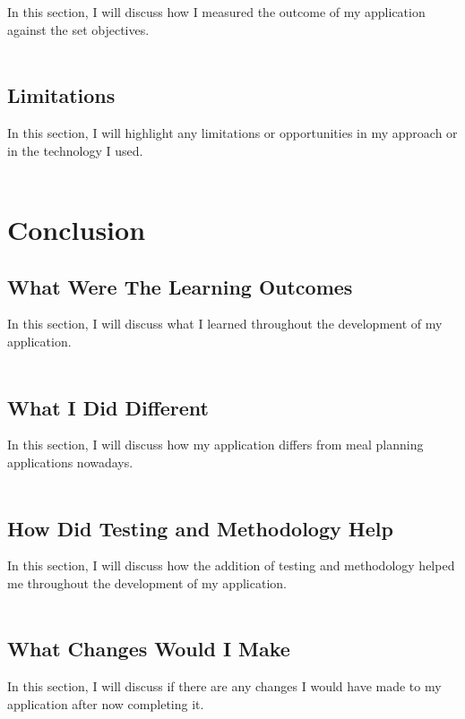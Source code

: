 In this section, I will discuss how I measured the outcome of my application against the set objectives.\\ \\

\section{Limitations}

In this section, I will highlight any limitations or opportunities in my approach or in the technology I used.\\ \\

\chapter{Conclusion}

\section{What Were The Learning Outcomes}

In this section, I will discuss what I learned throughout the development of my application.\\ \\

\section{What I Did Different}

In this section, I will discuss how my application differs from meal planning applications nowadays.\\ \\

\section{How Did Testing and Methodology Help}

In this section, I will discuss how the addition of testing and methodology helped me throughout the development of my application.\\ \\

\section{What Changes Would I Make}

In this section, I will discuss if there are any changes I would have made to my application after now completing it.\\ \\

